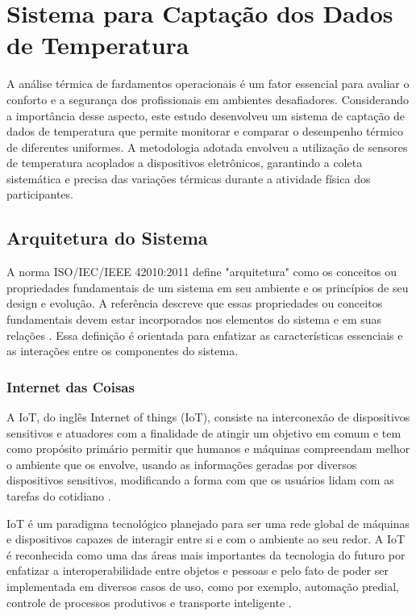 \chapter{Sistema para Captação dos Dados de Temperatura}
A análise térmica de fardamentos operacionais é um fator essencial para avaliar o conforto e a segurança dos profissionais em ambientes desafiadores. Considerando a importância desse aspecto, este estudo desenvolveu um sistema de captação de dados de temperatura que permite monitorar e comparar o desempenho térmico de diferentes uniformes. A metodologia adotada envolveu a utilização de sensores de temperatura acoplados a dispositivos eletrônicos, garantindo a coleta sistemática e precisa das variações térmicas durante a atividade física dos participantes.


\section{Arquitetura do Sistema}

A norma ISO/IEC/IEEE 42010:2011 define "arquitetura" como os conceitos ou propriedades fundamentais de um sistema em seu ambiente e os princípios de seu design e evolução. A referência descreve que essas propriedades ou conceitos fundamentais devem estar incorporados nos elementos do sistema e em suas relações \cite{ISO42010}. Essa definição é orientada para enfatizar as características essenciais e as interações entre os componentes do sistema.

\subsection{Internet das Coisas}

	A \acrlong{IoT}, do inglês Internet of things (\acrshort{IoT}), consiste na interconexão de dispositivos sensitivos e atuadores com a finalidade de atingir um
	 objetivo em comum \cite{giusto2010internet} e tem como propósito primário permitir que humanos e máquinas compreendam melhor o ambiente que os envolve,
	  usando as informações geradas por diversos dispositivos sensitivos, modificando a forma com que os usuários lidam com as tarefas do cotidiano \cite{atzori2010internet}.
	
	  \tab \acrshort{IoT} é um paradigma tecnológico planejado para ser uma rede global de máquinas e dispositivos capazes de interagir entre si e com o ambiente ao
	 seu redor. A \acrshort{IoT} é reconhecida como uma das áreas mais importantes da tecnologia do futuro por enfatizar a interoperabilidade entre objetos e pessoas
	  e pelo fato de poder ser implementada em diversos casos de uso, como por exemplo, automação predial, controle de processos produtivos e transporte inteligente \cite{gubbi2013internet}.
	
